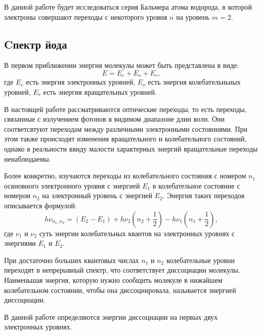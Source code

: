         В данной работе будет исследоваться серия Бальмера атома водорода, в которой электроны совершают переходы с некоторого уровня $n$ на уровень $m = 2$.


        \subsection{Cпектр йода}
        В первом приближении энергия молекулы может быть представлена в виде:
        \begin{equation}
            E=E_e+E_o+E_r,
        \end{equation}
        где $E_e$ есть энергия электронных уровней, $E_o$ есть энергия колебательньных уровней, $E_r$ есть энергия вращательных уровней.

        В настоящей работе рассматриваются оптические переходы, то есть переходы, связанные с излучением фотонов в видимом диапазоне длин волн. Они соответсвтуют переходам между различными электронными состояниями. При этом также происходят изменения вращательного и колебательного состояний, однако в реальности ввиду малости характерных энергий вращательные переходы ненаблюдаемы.

        Более конкретно, изучаются переходы из колебательного состояния с номером $n_1$ освновного электронного уровня с энергией $E_1$ в колебательное состояние с номером $n_2$ на электронный уровень с энергией $E_2$. Энергия таких переходов описывается формулой:
        \begin{equation}
            h \nu_{n_1,n_2}=(E_2-E_1)+h\nu_2(n_2+\dfrac{1}{2})-h \nu_1(n_1+\dfrac{1}{2}),
        \end{equation}
        где $\nu_1$ и $\nu_2$ суть энергии колебательных квантов на электронных уровнях с энергиями $E_1$ и $E_2$.

        При достаточно больших квантовых числах $n_1$ и $n_2$ колебательные уровни переходят в непрерывный спектр, что соответствует диссоциации молекулы. Наименьшая энергия, которую нужно сообщить молекуле в нижайшем колебательном состоянии, чтобы она диссоциировала, называется энергией диссоциации.

        В данной работе определяются энергии диссоциации на первых двух электронных уровнях.
     